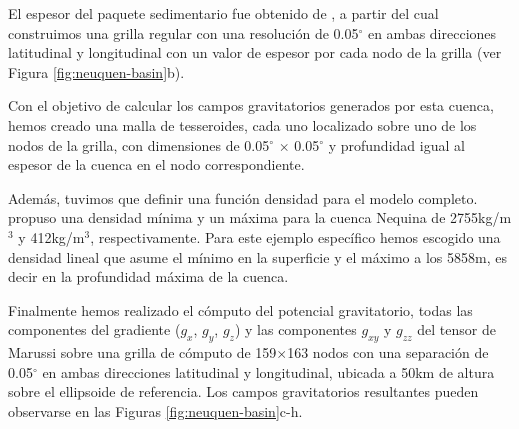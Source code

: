 \documentclass[a4paper,10pt]{article}
\begin{document}
El espesor del paquete sedimentario fue obtenido de \citet{Heine2007}, a partir del cual construimos una grilla regular con una resolución de 0.05$^\circ$ en ambas direcciones latitudinal y longitudinal con un valor de espesor por cada nodo de la grilla (ver Figura \ref{fig:neuquen-basin}b).

Con el objetivo de calcular los campos gravitatorios generados por esta cuenca, hemos creado una malla de tesseroides, cada uno localizado sobre uno de los nodos de la grilla, con dimensiones de 0.05$^\circ$ $\times$ 0.05$^\circ$ y profundidad igual al  espesor de la cuenca en el nodo correspondiente.

Además, tuvimos que definir una función densidad para el modelo completo.
\citet{Sigismondi2012} propuso una densidad mínima y un máxima para la cuenca Nequina de 2755kg/m$^3$ y 412kg/m$^3$, respectivamente.
Para este ejemplo específico hemos escogido una densidad lineal que asume el mínimo en la superficie y el máximo a los 5858m, es decir en la profundidad máxima de la cuenca.

Finalmente hemos realizado el cómputo del potencial gravitatorio, todas las componentes del gradiente ($g_x$, $g_y$, $g_z$) y las componentes $g_{xy}$ y $g_{zz}$ del tensor de Marussi sobre una grilla de cómputo de 159$\times$163 nodos con una separación de 0.05$^\circ$ en ambas direcciones latitudinal y longitudinal, ubicada a 50km de altura sobre el ellipsoide de referencia.
Los campos gravitatorios resultantes pueden observarse en las Figuras \ref{fig:neuquen-basin}c-h.




\end{document}
